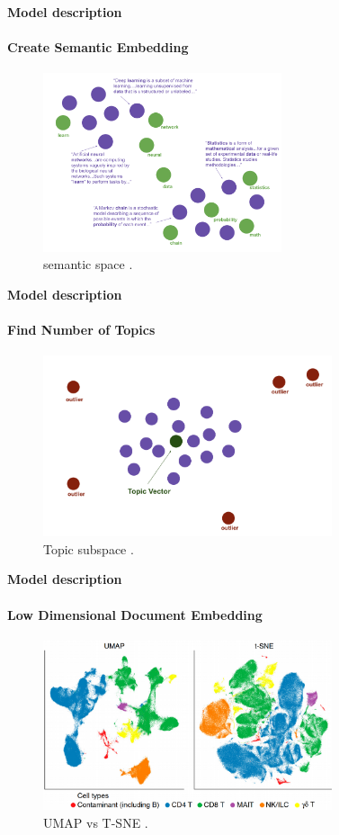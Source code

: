 \begin{frame}[fragile=singleslide]{\large \textbf{Model description}}
  \framesubtitle{Create Semantic Embedding}
  \begin{figure}[ht!]
    \includegraphics[width=7cm]{Graphics/doc_word_embedding.png}
    \caption{semantic space \cite{Angelov_2020}.}
  \end{figure}
\end{frame}

\begin{frame}[fragile=singleslide]{\large \textbf{Model description}}
  \framesubtitle{Find Number of Topics}
  \begin{figure}[ht!]
    \includegraphics[width=8.5cm]{Graphics/topic_vector.png}
    \caption{Topic subspace \cite{Angelov_2020}.}
  \end{figure}
\end{frame}

\begin{frame}[fragile=singleslide]{\large \textbf{Model description}}
  \framesubtitle{Low Dimensional Document Embedding}
  \begin{figure}[ht!]
    \includegraphics[width=8.5cm]{Graphics/umap.png}
    \caption{UMAP vs T-SNE \cite{Becht_2018}.}
  \end{figure}
\end{frame}

